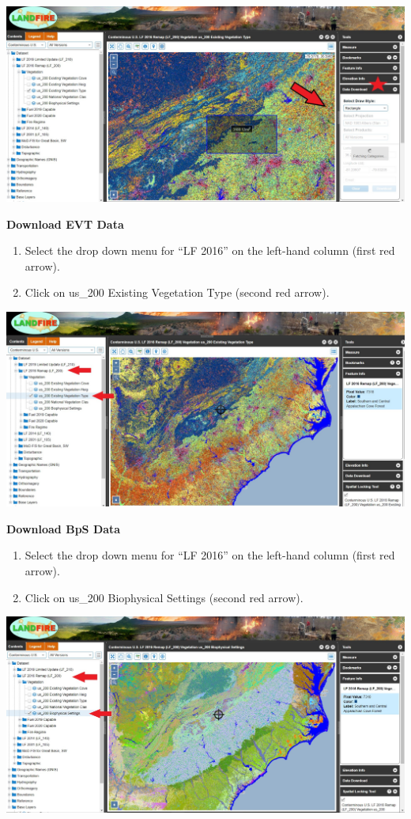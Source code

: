 \documentclass[
]{book}
\providecommand{\tightlist}{%
  \setlength{\itemsep}{0pt}\setlength{\parskip}{0pt}}
\begin{document}
\includegraphics[width=1000pt]{KP_screenshots/LANDFIRE Rectangle Data Download}

\textbf{Download EVT Data}

\begin{enumerate}
\def\labelenumi{\arabic{enumi}.}
\tightlist
\item
  Select the drop down menu for ``LF 2016'' on the left-hand column (first red arrow).
\item
  Click on us\_200 Existing Vegetation Type (second red arrow).
\end{enumerate}

\includegraphics[width=1000pt]{KP_screenshots/LANDFIRE Find EVT}

\textbf{Download BpS Data}

\begin{enumerate}
\def\labelenumi{\arabic{enumi}.}
\tightlist
\item
  Select the drop down menu for ``LF 2016'' on the left-hand column (first red arrow).
\item
  Click on us\_200 Biophysical Settings (second red arrow).
\end{enumerate}

\includegraphics[width=1000pt]{KP_screenshots/LANDFIRE Find BpS}
\end{document}
